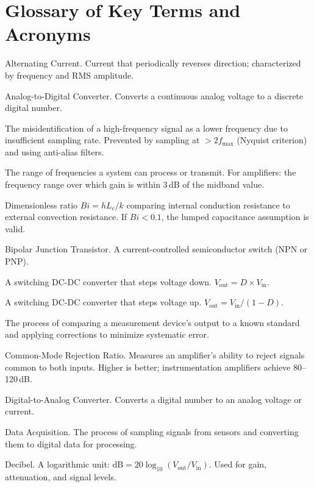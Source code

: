 \documentclass[11pt,letterpaper,twoside,openany]{book}
\begin{document}
\chapter*{Glossary of Key Terms and Acronyms}

\begin{description}[style=nextline,leftmargin=3em,font=\sffamily\bfseries]
\item[AC] Alternating Current. Current that periodically reverses direction; characterized by frequency and RMS amplitude.
\item[ADC] Analog-to-Digital Converter. Converts a continuous analog voltage to a discrete digital number.
\item[Aliasing] The misidentification of a high-frequency signal as a lower frequency due to insufficient sampling rate. Prevented by sampling at $> 2f_{\max}$ (Nyquist criterion) and using anti-alias filters.
\item[Bandwidth] The range of frequencies a system can process or transmit. For amplifiers: the frequency range over which gain is within 3\,dB of the midband value.
\item[Biot Number (Bi)] Dimensionless ratio $Bi = hL_c/k$ comparing internal conduction resistance to external convection resistance. If $Bi < 0.1$, the lumped capacitance assumption is valid.
\item[BJT] Bipolar Junction Transistor. A current-controlled semiconductor switch (NPN or PNP).
\item[Buck Converter] A switching DC-DC converter that steps voltage down. $V_{\text{out}} = D \times V_{\text{in}}$.
\item[Boost Converter] A switching DC-DC converter that steps voltage up. $V_{\text{out}} = V_{\text{in}}/(1-D)$.
\item[Calibration] The process of comparing a measurement device's output to a known standard and applying corrections to minimize systematic error.
\item[CMRR] Common-Mode Rejection Ratio. Measures an amplifier's ability to reject signals common to both inputs. Higher is better; instrumentation amplifiers achieve 80--120\,dB.
\item[DAC] Digital-to-Analog Converter. Converts a digital number to an analog voltage or current.
\item[DAQ] Data Acquisition. The process of sampling signals from sensors and converting them to digital data for processing.
\item[dB] Decibel. A logarithmic unit: $\text{dB} = 20\log_{10}(V_{\text{out}}/V_{\text{in}})$. Used for gain, attenuation, and signal levels.

\end{description}
\end{document}
